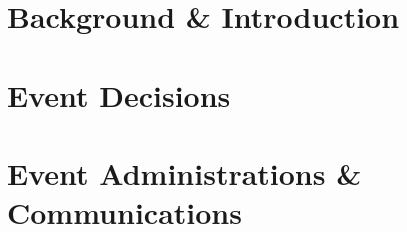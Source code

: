 \documentclass[a4paper, 11pt]{report}
\begin{document}
\makeDocumentTitle

\tableofcontents


\part{Background \& Introduction}
    
    
    
\part{Event Decisions}
    
    
    
    
    
    
    
\part{Event Administrations \& Communications}
    
    
    
    
\end{document}
